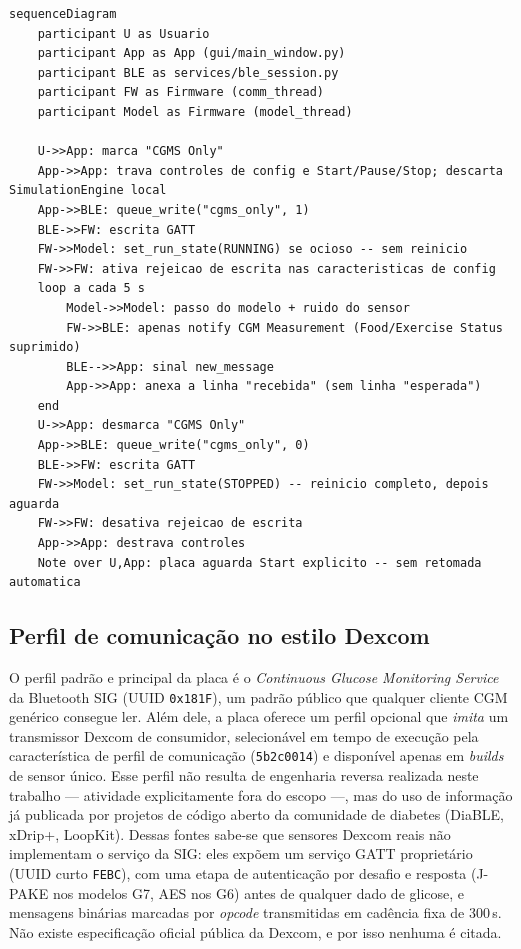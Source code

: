 \begin{lstlisting}[language=mermaid,caption={Fluxo do modo CGMS Only: a placa como fonte CGM-padrão isolada.},label={lst:fluxo-cgms-only}]
sequenceDiagram
    participant U as Usuario
    participant App as App (gui/main_window.py)
    participant BLE as services/ble_session.py
    participant FW as Firmware (comm_thread)
    participant Model as Firmware (model_thread)

    U->>App: marca "CGMS Only"
    App->>App: trava controles de config e Start/Pause/Stop; descarta SimulationEngine local
    App->>BLE: queue_write("cgms_only", 1)
    BLE->>FW: escrita GATT
    FW->>Model: set_run_state(RUNNING) se ocioso -- sem reinicio
    FW->>FW: ativa rejeicao de escrita nas caracteristicas de config
    loop a cada 5 s
        Model->>Model: passo do modelo + ruido do sensor
        FW->>BLE: apenas notify CGM Measurement (Food/Exercise Status suprimido)
        BLE-->>App: sinal new_message
        App->>App: anexa a linha "recebida" (sem linha "esperada")
    end
    U->>App: desmarca "CGMS Only"
    App->>BLE: queue_write("cgms_only", 0)
    BLE->>FW: escrita GATT
    FW->>Model: set_run_state(STOPPED) -- reinicio completo, depois aguarda
    FW->>FW: desativa rejeicao de escrita
    App->>App: destrava controles
    Note over U,App: placa aguarda Start explicito -- sem retomada automatica
\end{lstlisting}

\subsection{Perfil de comunicação no estilo Dexcom}
\label{sec:perfil-dexcom}

O perfil padrão e principal da placa é o \textit{Continuous Glucose
Monitoring Service} da Bluetooth SIG (UUID \texttt{0x181F}), um padrão
público que qualquer cliente CGM genérico consegue ler. Além dele, a placa
oferece um perfil opcional que \emph{imita} um transmissor Dexcom de
consumidor, selecionável em tempo de execução pela característica de perfil
de comunicação (\texttt{5b2c0014}) e disponível apenas em \textit{builds} de
sensor único. Esse perfil não resulta de engenharia reversa realizada neste
trabalho --- atividade explicitamente fora do escopo ---, mas do uso de
informação já publicada por projetos de código aberto da comunidade de
diabetes (DiaBLE, xDrip+, LoopKit). Dessas fontes sabe-se que sensores Dexcom
reais não implementam o serviço da SIG: eles expõem um serviço GATT
proprietário (UUID curto \texttt{FEBC}), com uma etapa de
autenticação por desafio e resposta (J-PAKE nos modelos G7, AES nos G6) antes
de qualquer dado de glicose, e mensagens binárias marcadas por \textit{opcode}
transmitidas em cadência fixa de 300\,s. Não existe especificação oficial
pública da Dexcom, e por isso nenhuma é citada.

